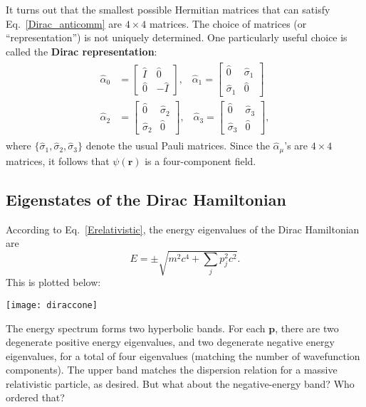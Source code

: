 \documentclass[pra,12pt]{revtex4}
\begin{document}
It turns out that the smallest possible Hermitian matrices that can
satisfy Eq.~\eqref{Dirac_anticomm} are $4\times4$ matrices.  The
choice of matrices (or ``representation'') is not uniquely determined.
One particularly useful choice is called the \textbf{Dirac
  representation}:
\begin{align}
  \begin{aligned}
    \hat{\alpha}_0 &= \begin{bmatrix}
      \hat{I}\, & \hat{0} \\ \hat{0} & -\hat{I}
    \end{bmatrix}, \;\;\;
    \hat{\alpha}_1 = \begin{bmatrix}
      \hat{0} & \hat{\sigma}_1 \\ \hat{\sigma}_1 & \hat{0}
    \end{bmatrix} \\
    \hat{\alpha}_2 &= \begin{bmatrix}
      \hat{0} & \hat{\sigma}_2 \\ \hat{\sigma}_2 & \hat{0}
    \end{bmatrix}, \;\;\;
    \hat{\alpha}_3 = \begin{bmatrix}
      \hat{0} & \hat{\sigma}_3 \\ \hat{\sigma}_3 & \hat{0}
    \end{bmatrix},
  \end{aligned}
  \label{alpha_matrices}
\end{align}
where $\{\hat{\sigma}_{1}, \hat{\sigma}_{2}, \hat{\sigma}_{3}\}$
denote the usual Pauli matrices.  Since the $\hat{\alpha}_\mu$'s are
$4\times4$ matrices, it follows that $\psi(\mathbf{r})$ is a
four-component field.

\subsection{Eigenstates of the Dirac Hamiltonian}
\label{sec:deigenstates}

According to Eq.~\eqref{Erelativistic}, the energy eigenvalues of the
Dirac Hamiltonian are
\begin{equation}
  E = \pm \sqrt{m^2c^4 + \sum_{j} p_j^2c^2}.
\end{equation}
This is plotted below:

\begin{center}
  \texttt{[image: diraccone]}
\end{center}

\noindent
The energy spectrum forms two hyperbolic bands.  For each
$\mathbf{p}$, there are two degenerate positive energy eigenvalues,
and two degenerate negative energy eigenvalues, for a total of four
eigenvalues (matching the number of wavefunction components).  The
upper band matches the dispersion relation for a massive relativistic
particle, as desired.  But what about the negative-energy band?  Who
ordered that?
\end{document}
